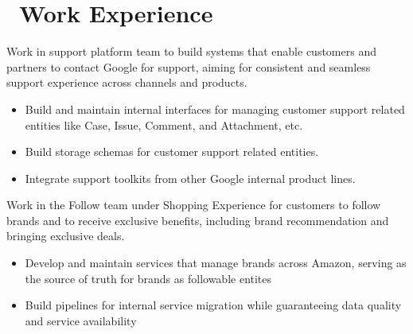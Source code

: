 \documentclass{resume}
\begin{document}
\section{\faIndustry\ Work Experience}
\begin{flushleft}
Work in support platform team to build systems that enable customers and partners to contact Google for support, aiming for consistent and seamless support experience across channels and products.
\begin{itemize}
  \item Build and maintain internal interfaces for managing customer support related entities like Case, Issue, Comment, and Attachment, etc.
  \item Build storage schemas for customer support related entities.
  \item Integrate support toolkits from other Google internal product lines.
\end{itemize}
\end{flushleft}
\begin{flushleft}
Work in the Follow team under Shopping Experience for customers to follow brands and to receive exclusive benefits, including brand recommendation and bringing exclusive deals.
\begin{itemize}
  \item Develop and maintain services that manage brands across Amazon, serving as the source of truth for brands as followable entites
  \item Build pipelines for internal service migration while guaranteeing data quality and service availability
\end{itemize}
\end{flushleft}
\end{document}
